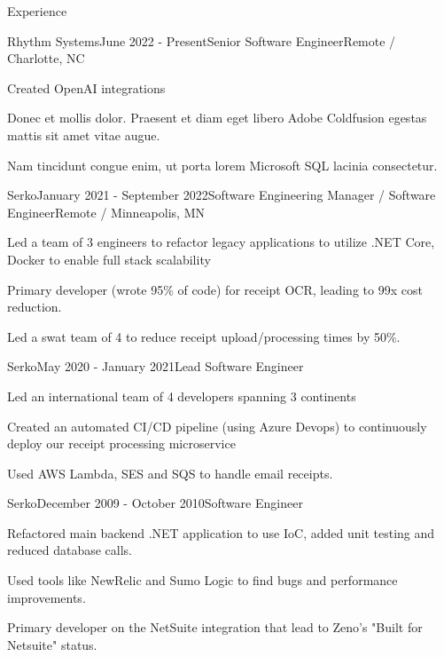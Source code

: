 \documentclass[
	12pt, %
]{resume} %
\begin{document}
\begin{rSection}{Experience}

	\begin{rSubsection}{Rhythm Systems}{June 2022 - Present}{Senior Software Engineer}{Remote / Charlotte, NC}
		\item Created OpenAI integrations
		\item Donec et mollis dolor. Praesent et diam eget libero Adobe Coldfusion egestas mattis sit amet vitae augue.
		\item Nam tincidunt congue enim, ut porta lorem Microsoft SQL lacinia consectetur.
	\end{rSubsection}


	\begin{rSubsection}{Serko}{January 2021 - September 2022}{Software Engineering Manager / Software Engineer}{Remote / Minneapolis, MN}
		\item Led a team of 3 engineers to refactor legacy applications to utilize .NET Core, Docker to enable full stack scalability	
		\item Primary developer (wrote 95\% of code) for receipt OCR, leading to 99x cost reduction.
		\item Led a swat team of 4 to reduce receipt upload/processing times by 50\%.
	\end{rSubsection}
	\begin{rSubsection}{Serko}{May 2020 - January 2021}{Lead Software Engineer}{}
		\item Led an international team of 4 developers spanning 3 continents
		\item Created an automated CI/CD pipeline (using Azure Devops) to continuously deploy our receipt processing microservice
		\item Used AWS Lambda, SES and SQS to handle email receipts.
	\end{rSubsection}
	\begin{rSubsection}{Serko}{December 2009 - October 2010}{Software Engineer}{}
		\item Refactored main backend .NET application to use IoC, added unit testing and reduced database calls.
		\item Used tools like NewRelic and Sumo Logic to find bugs and performance improvements.
		\item Primary developer on the NetSuite integration that lead to Zeno's "Built for Netsuite" status.
	\end{rSubsection}


\end{rSection}
\end{document}
